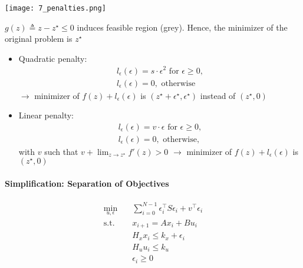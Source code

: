 \begin{examplesection}
    \begin{center}
        \texttt{[image: 7\_penalties.png]}
    \end{center}

    $g(z) \triangleq z - z^\star \leq 0$ induces feasible region (grey). Hence, the minimizer of the original problem is $z^\star$

    \begin{itemize}
        \item Quadratic penalty:
              \begin{gather*}
                  l_\epsilon(\epsilon) = s \cdot \epsilon^2 \text{ for } \epsilon \geq 0,\\
                  l_\epsilon(\epsilon) = 0, \text{ otherwise}
              \end{gather*}
              $\rightarrow$ minimizer of $f(z) + l_\epsilon(\epsilon)$ is $(z^\star + \epsilon^\star, \epsilon^\star)$ instead of $(z^\star, 0)$
        \item Linear penalty:
              \begin{gather*}
                  l_\epsilon(\epsilon) = v \cdot \epsilon \text{ for }\epsilon \geq 0,\\
                  l_\epsilon(\epsilon) = 0, \text{ otherwise},
              \end{gather*}
              with $v$ such that $v + \lim_{z \to z^\star} f'(z) > 0$
              \newpar{}
              $\rightarrow$ minimizer of $f(z) + l_\epsilon(\epsilon)$ is $(z^\star, 0)$
    \end{itemize}
\end{examplesection}

\paragraph{Simplification: Separation of Objectives}
\begin{align*}
    \min_{u, \epsilon} \quad & \sum_{i=0}^{N-1} \epsilon_i^\top S \epsilon_i + v^\top \epsilon_i \\
    \text{s.t.} \quad        & x_{i+1} = A x_i + B u_i                                           \\
                             & H_x x_i \leq k_x + \epsilon_i                                     \\
                             & H_u u_i \leq k_u                                                  \\
                             & \epsilon_i \geq 0
\end{align*}
\newpar{}

